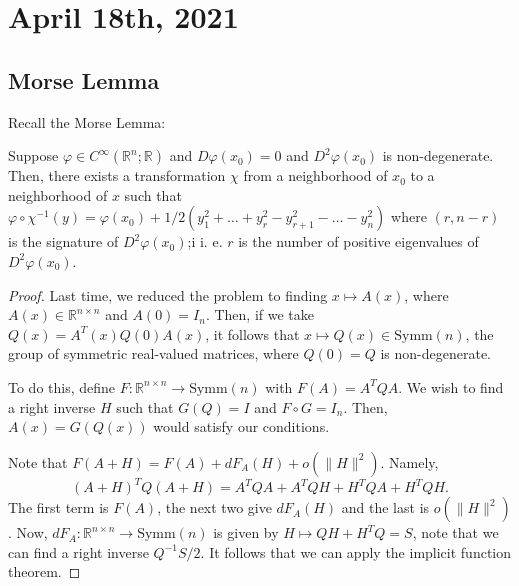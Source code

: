 \documentclass[12pt]{scrartcl}
\newcommand{\R}{\mathbb{R}}
\newcommand{\<}{\langle}
\renewcommand{\>}{\rangle}
\let \phi \varphi
\begin{document}
\pagebreak
\section{April 18th, 2021}
\subsection{Morse Lemma}
Recall the Morse Lemma:
\begin{theorem} Suppose $\phi \in C^\infty(\R^n; \R)$ and $D\phi(x_0) = 0$ and $D^2\phi(x_0) $ is non-degenerate.  Then, there exists a transformation $\chi$ from a neighborhood of $x_0$ to a neighborhood of $x$ such that $\phi \circ \chi^{-1}(y) = \phi(x_0) + 1/2 (y_1^2 + \dots + y_r^2 - y_{r+1}^2 - \dots - y_n^2)$ where $(r, n-r)$ is the signature of $D^2\phi(x_0)$;i i. e. $r$ is the number of positive eigenvalues of $D^2 \phi(x_0)$. 
\end{theorem}
\begin{proof}
Last time, we reduced the problem to finding $x \mapsto A(x)$, where $A(x) \in \R^{n \times n}$ and $A(0) = I_n$.  Then, if we take $Q(x)  = A^T(x) Q(0) A(x)$, it follows that $x \mapsto Q(x) \in \text{Symm}(n)$, the group of symmetric real-valued matrices, where $Q(0) = Q$ is non-degenerate.

To do this, define $F: \R^{n \times n} \to \text{Symm}(n)$ with $F(A) = A^TQA $.  We wish to find a right inverse $H$ such that $G(Q) = I$ and $F \circ G = I_n$.  Then, $A(x) = G(Q(x))$ would satisfy our conditions.  

Note that $F(A+H) = F(A) + dF_A(H) + o(\|H\|^2)$.  Namely,
$$(A+H)^TQ(A+H) = A^TQA + A^TQH + H^TQA + H^TQH.$$
The first term is $F(A)$, the next two give $dF_A(H)$ and the last is $o(\|H\|^2)$.  Now, $dF_A: \R^{n \times n} \to \text{Symm}(n)$ is given by $H \mapsto QH + H^TQ = S$, note that we can find a right inverse $Q^{-1}S/2$.  It follows that we can apply the implicit function theorem.
\end{proof}
\end{document}
